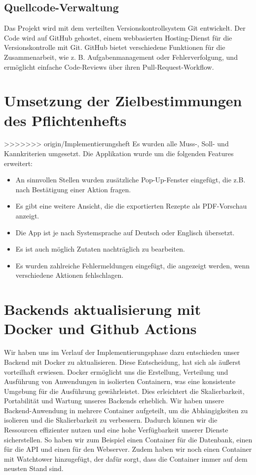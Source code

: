 \documentclass{implementierungsheft}
\begin{document}
\subsection{Quellcode-Verwaltung}
Das Projekt wird mit dem verteilten Versionskontrollsystem Git entwickelt. Der Code wird
auf GitHub gehostet, einem webbasierten Hosting-Dienst für die Versionskontrolle mit Git. GitHub bietet
verschiedene Funktionen für die Zusammenarbeit, wie z. B. Aufgabenmanagement oder Fehlerverfolgung, und ermöglicht einfache
Code-Reviews über ihren Pull-Request-Workflow.
\newpage

\section{Umsetzung der Zielbestimmungen des Pflichtenhefts} \label{sec:changes}
>>>>>>> origin/Implementierungsheft
Es wurden alle Muss-, Soll- und Kannkriterien umgesetzt. Die Applikation wurde um die folgenden Features erweitert:
\begin{itemize}
    \item An sinnvollen Stellen wurden zusätzliche Pop-Up-Fenster eingefügt, die z.B. nach Bestätigung einer Aktion fragen.
    \item Es gibt eine weitere Ansicht, die die exportierten Rezepte als PDF-Vorschau anzeigt.
    \item Die App ist je nach Systemsprache auf Deutsch oder Englisch übersetzt.
    \item Es ist auch möglich Zutaten nachträglich zu bearbeiten.
    \item Es wurden zahlreiche Fehlermeldungen eingefügt, die angezeigt werden, wenn verschiedene Aktionen fehlschlagen.
\end{itemize}

\section{Backends aktualisierung mit Docker und Github Actions}
Wir haben uns im Verlauf der Implementierungsphase dazu entschieden unser Backend mit Docker zu aktualisieren.
Diese Entscheidung, hat sich als äußerst vorteilhaft erwiesen. Docker ermöglicht uns die Erstellung, Verteilung und Ausführung von Anwendungen in isolierten Containern, was eine konsistente Umgebung für die Ausführung gewährleistet. Dies erleichtert die Skalierbarkeit, Portabilität und Wartung unseres Backends erheblich.
Wir haben unsere Backend-Anwendung in mehrere Container aufgeteilt, um die Abhängigkeiten zu isolieren und die Skalierbarkeit zu verbessern. Dadurch können wir die Ressourcen effizienter nutzen und eine hohe Verfügbarkeit unserer Dienste sicherstellen.
So haben wir zum Beispiel einen Container für die Datenbank, einen für die API und einen für den Webserver.
Zudem haben wir noch einen Container mit Watchtower hinzugefügt, der dafür sorgt, dass die Container immer auf dem neusten Stand sind.
\end{document}
